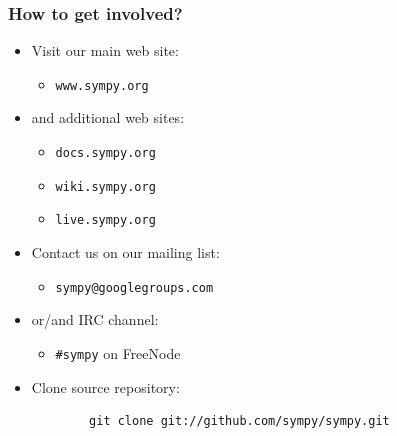 \documentclass[10pt,polish]{beamer}
\begin{document}
\begin{frame}[fragile]
    \frametitle{How to get involved?}

    \begin{itemize}
        \item Visit our main web site:
            \begin{itemize}
                \item \texttt{www.sympy.org}
            \end{itemize}
        \item and additional web sites:
            \begin{itemize}
                \item \texttt{docs.sympy.org}
                \item \texttt{wiki.sympy.org}
                \item \texttt{live.sympy.org}
            \end{itemize}
        \item Contact us on our mailing list:
            \begin{itemize}
                \item \texttt{sympy@googlegroups.com}
            \end{itemize}
        \item or/and IRC channel:
            \begin{itemize}
                \item \texttt{\#sympy} on FreeNode
            \end{itemize}
        \item Clone source repository:
        \begin{verbatim}
        git clone git://github.com/sympy/sympy.git
        \end{verbatim}
    \end{itemize}
\end{frame}
\end{document}
